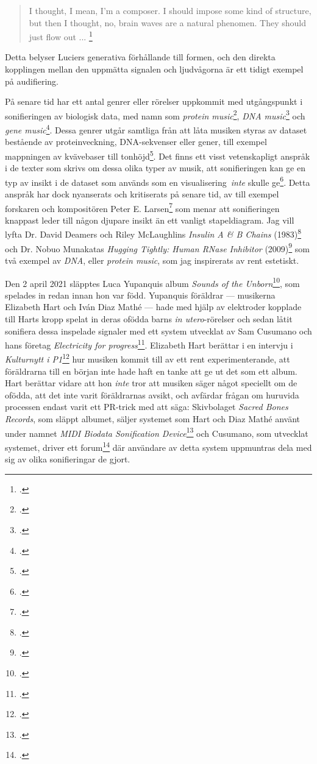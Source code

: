 \documentclass[11pt, a4paper]{article} %
\begin{document}
\begin{quote}
  I thought,  I mean, I'm a composer. I should impose some kind of structure, but then I thought, no, brain waves are a natural phenomen. They should just flow out ... \footcite{straebel_alvin_2014}
\end{quote}

Detta belyser Luciers generativa förhållande till formen, och den direkta kopplingen mellan den uppmätta signalen och ljudvågorna är ett tidigt exempel på audifiering.

På senare tid har ett antal genrer eller rörelser uppkommit med utgångspunkt i sonifieringen av biologisk data, med namn som \emph{protein music}\footcite{king_pm_1996}, \emph{DNA music}\footcite{k_kawazoe_study_2001} och \emph{gene music}\footcite{munakata_gene_1995}. Dessa genrer utgår samtliga från att låta musiken styras av dataset bestående av proteinveckning, DNA-sekvenser eller gener, till exempel mappningen av kvävebaser till tonhöjd\footcite{shi_electronic_2007}. Det finns ett visst vetenskapligt anspråk i de texter som skrivs om dessa olika typer av musik, att sonifieringen kan ge en typ av insikt i de dataset som används som en visualisering \emph{inte} skulle ge\footcite{king_pm_1996}. Detta anspråk har dock nyanserats och kritiserats på senare tid, av till exempel forskaren och kompositören Peter E. Larsen\footcite{larsen_more_2016} som menar att sonifieringen knappast leder till någon djupare insikt än ett vanligt stapeldiagram. Jag vill lyfta Dr. David Deamers och Riley McLaughlins \emph{Insulin A \& B Chains} (1983)\footcite{deamer_insulin_1983} och Dr. Nobuo Munakatas \emph{Hugging Tightly: Human RNase Inhibitor} (2009)\footcite{munakata_hugging_2009} som två exempel av \emph{DNA}, eller \emph{protein music}, som jag inspirerats av rent estetiskt.

Den 2 april 2021 släpptes Luca Yupanquis album \emph{Sounds of the Unborn}\footcite{yupanqui_sounds_2021}, som spelades in redan innan hon var född. Yupanquis föräldrar --- musikerna Elizabeth Hart och Iván Diaz Mathé --- hade med hjälp av elektroder kopplade till Harts kropp spelat in deras ofödda barns \emph{in utero}-rörelser och sedan låtit sonifiera dessa inspelade signaler med ett system utvecklat av Sam Cusumano och hans företag \emph{Electricity for progress}\footcite{noauthor_electricity_nodate}. Elizabeth Hart berättar i en intervju i \emph{Kulturnytt i P1}\footcite{eklund_duo_2021} hur musiken kommit till av ett rent experimenterande, att föräldrarna till en början inte hade haft en tanke att ge ut det som ett album. Hart berättar vidare att hon \emph{inte} tror att musiken säger något speciellt om de ofödda, att det inte varit föräldrarnas avsikt, och avfärdar frågan om huruvida processen endast varit ett PR-trick med att säga:  Skivbolaget \emph{Sacred Bones Records}, som släppt albumet, säljer systemet som Hart och Diaz Mathé använt under namnet \emph{MIDI Biodata Sonification Device}\footcite{noauthor_midi_nodate} och Cusumano, som utvecklat systemet, driver ett forum\footcite{noauthor_biodata_nodate} där användare av detta system uppmuntras dela med sig av olika sonifieringar de gjort. 
\end{document}
